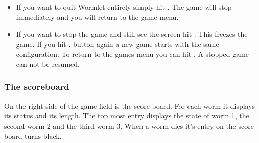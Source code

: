 \begin{description}
\begin{itemize}
\item If you want to quit Wormlet entirely simply hit
.
The game will stop immediately and you will return to the game menu. 
\item If you want to stop the game and still see the screen hit 
.
This freezes the game. If you hit
.
button again a new game starts with the same configuration. To return to the
games menu you can hit
. A stopped game can not be resumed. 
\end{itemize}
\end{description}

\subsubsection{The scoreboard}
On the right side of the game field is the score board. For each worm it
displays its status and its length. The top most entry displays the
state of worm 1, the second worm 2 and the third worm 3. When a worm
dies it's entry on the score board turns black.

